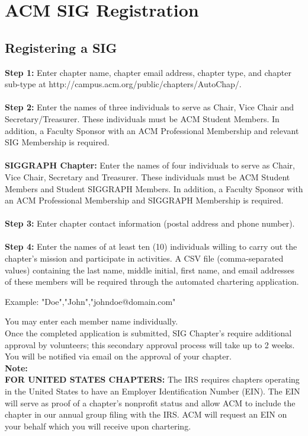 %
%

\chapter{ACM SIG Registration}
\label{app:app02}

\section{Registering a SIG}
\label{sec:sec01}

\textbf{Step 1:}  Enter chapter name, chapter email address, chapter type, and chapter sub-type at http://campus.acm.org/public/chapters/AutoChap/.
\\
\\
\textbf{Step 2:}  Enter the names of three individuals to serve as Chair, Vice Chair and Secretary/Treasurer. These individuals must be ACM Student Members. In addition, a Faculty Sponsor with an ACM Professional Membership and relevant SIG Membership is required.
\\
\\
\textbf{SIGGRAPH Chapter:}  Enter the names of four individuals to serve as Chair, Vice Chair, Secretary and Treasurer. These individuals must be ACM Student Members and Student SIGGRAPH Members. In addition, a Faculty Sponsor with an ACM Professional Membership and SIGGRAPH Membership is required.
\\
\\
\textbf{Step 3:}  Enter chapter contact information (postal address and phone number).
\\
\\
\textbf{Step 4:}  Enter the names of at least ten (10) individuals willing to carry out the chapter's mission and participate in activities.  A CSV file (comma-separated values) containing the last name, middle initial, first name, and email addresses of these members will be required through the automated chartering application.

\begin{flushright}
Example: "Doe","John","johndoe@domain.com"
\end{flushright}

You may enter each member name individually.
\\
Once the completed application is submitted, SIG Chapter's require additional approval by volunteers; this secondary approval process will take up to 2 weeks. You will be notified via email on the approval of your chapter.
\\
\textbf{Note:}
\\
\textbf{FOR UNITED STATES CHAPTERS:}  The IRS requires chapters operating in the United States to have an Employer Identification Number (EIN). The EIN will serve as proof of a chapter's nonprofit status and allow ACM to include the chapter in our annual group filing with the IRS. ACM will request an EIN on your behalf which you will receive upon chartering.
